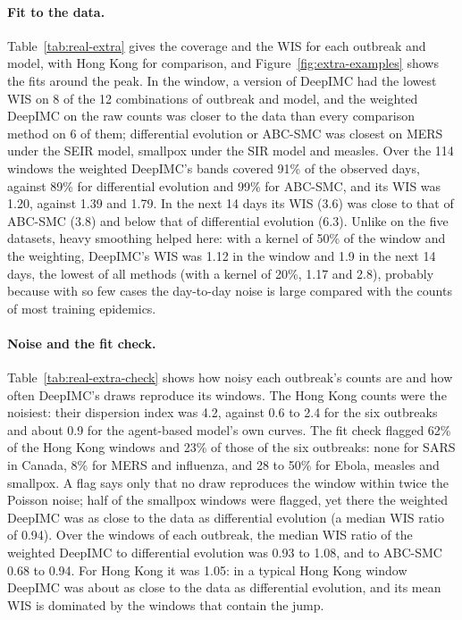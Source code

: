 \documentclass[12pt]{article}
\begin{document}
\paragraph{Fit to the data.} Table~\ref{tab:real-extra} gives the coverage and the WIS for each outbreak and model,
with Hong Kong for comparison, and Figure~\ref{fig:extra-examples} shows the fits around the peak. In the window, a
version of DeepIMC had the lowest WIS on 8 of the 12 combinations of outbreak and model, and the weighted DeepIMC on
the raw counts was closer to the data than every comparison method on 6 of them; differential evolution or ABC-SMC
was closest on MERS under the SEIR model, smallpox under the SIR model and measles. Over the 114 windows the weighted
DeepIMC's bands covered 91\% of the observed days, against 89\% for differential evolution and 99\% for ABC-SMC,
and its WIS was 1.20, against 1.39 and 1.79. In the next 14 days its WIS (3.6) was close to that of ABC-SMC (3.8)
and below that of differential evolution (6.3). Unlike on the five datasets, heavy smoothing helped here: with a
kernel of 50\% of the window and the weighting, DeepIMC's WIS was 1.12 in the window and 1.9 in the next 14 days,
the lowest of all methods (with a kernel of 20\%, 1.17 and 2.8), probably because with so few cases the day-to-day noise is large compared with the
counts of most training epidemics.

\paragraph{Noise and the fit check.} Table~\ref{tab:real-extra-check} shows how noisy each outbreak's counts are and
how often DeepIMC's draws reproduce its windows. The Hong Kong counts were the noisiest: their dispersion index was
4.2, against 0.6 to 2.4 for the six outbreaks and about 0.9 for the agent-based model's own curves. The fit check
flagged 62\% of the Hong Kong windows and 23\% of those of the six outbreaks: none for SARS in Canada, 8\% for MERS
and influenza, and 28 to 50\% for Ebola, measles and smallpox. A flag says only that no draw reproduces the window
within twice the Poisson noise; half of the smallpox windows were flagged, yet there the weighted DeepIMC was as
close to the data as differential evolution (a median WIS ratio of 0.94). Over the windows of each outbreak, the
median WIS ratio of the weighted DeepIMC to differential evolution was 0.93 to 1.08, and to ABC-SMC 0.68 to 0.94.
For Hong Kong it was 1.05: in a typical Hong Kong window DeepIMC was about as close to the data as differential
evolution, and its mean WIS is dominated by the windows that contain the jump.
\end{document}

